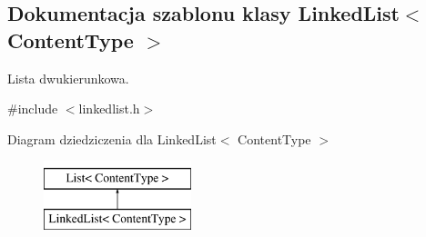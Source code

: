 \hypertarget{class_linked_list}{\subsection{Dokumentacja szablonu klasy Linked\-List$<$ Content\-Type $>$}
\label{class_linked_list}
}


Lista dwukierunkowa.  




{\ttfamily \#include $<$linkedlist.\-h$>$}

Diagram dziedziczenia dla Linked\-List$<$ Content\-Type $>$\begin{figure}[H]
\begin{center}
\leavevmode
\includegraphics[height=2.000000cm]{class_linked_list}
\end{center}
\end{figure}
